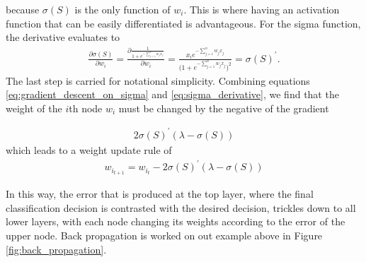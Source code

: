 because $\sigma(S)$ is the only function of $w_i$. This is where having an activation function that can be easily differentiated is advantageous. For the sigma function, the derivative evaluates to
\begin{align}
\frac{\partial\sigma(S)}{\partial w_i} =  \frac{\partial \frac{1}{1+e^{-\sum_{j=1}^n w_jx_j}}}{\partial w_i} = \frac{x_ie^{-\sum_{j=1}^n w_jx_j}}{\Big({1+e^{-\sum_{j=1}^n w_jx_j}}\Big)^2} = \sigma(S)^\prime.
\label{eq:sigma_derivative}
\end{align}
The last step is carried for notational simplicity. Combining equations \ref{eq:gradient_descent_on_sigma} and \ref{eq:sigma_derivative}, we find that the weight of the $i$th node $w_i$ must be changed by the negative of the gradient

\begin{align*}
  2\sigma(S)^\prime(\lambda - \sigma(S))
\end{align*}
which leads to a weight update rule of 
\begin{align}
  w_{i_{t+1}} = w_{i_t} - 2\sigma(S)^\prime(\lambda - \sigma(S))
  \label{eq:update_rule_for_sigma}
\end{align}

In this way, the error that is produced at the top layer, where the final classification decision is contrasted with the desired decision, trickles down to all lower layers, with each node changing its weights according to the error of the upper node. Back propagation is worked on out example above in Figure \ref{fig:back_propagation}.


